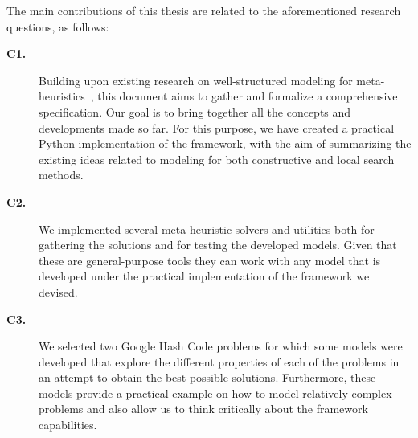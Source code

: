 The main contributions of this thesis are related to the aforementioned research
questions, as follows:

\begin{description}

  \item[\textbf{C1.}] Building upon existing research on well-structured
    modeling for meta-heuristics~\cite{vieira2009uma,fonseca2021nasf4nio,outeiro2021application},
    this document aims to gather and formalize a comprehensive specification. Our
    goal is to bring together all the concepts and developments made so far. For
    this purpose, we have created a practical Python implementation of the
    framework, with the aim of summarizing the existing ideas related to modeling
    for both constructive and local search methods.

  \item[\textbf{C2.}] We implemented several meta-heuristic solvers and utilities
    both for gathering the solutions and for testing the developed models. Given
    that these are general-purpose tools they can work with any model that is developed
    under the practical implementation of the framework we devised.

  \item[\textbf{C3.}] We selected two Google Hash Code problems for which some
    models were developed that explore the different properties of each of the problems
    in an attempt to obtain the best possible solutions. Furthermore, these
    models provide a practical example on how to model relatively complex
    problems and also allow us to think critically about the framework capabilities.
\end{description}